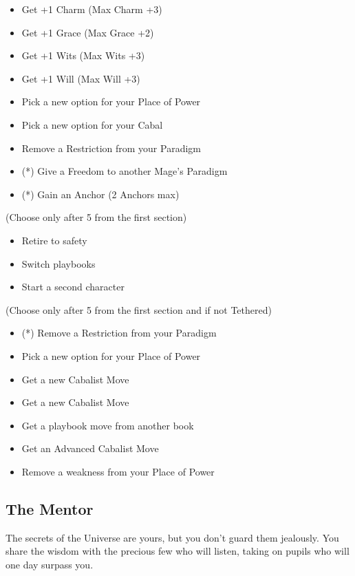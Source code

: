 \documentclass[
]{article}
\providecommand{\tightlist}{%
  \setlength{\itemsep}{0pt}\setlength{\parskip}{0pt}}
\begin{document}
\begin{itemize}
\tightlist
\item
  Get +1 Charm (Max Charm +3)
\item
  Get +1 Grace (Max Grace +2)
\item
  Get +1 Wits (Max Wits +3)
\item
  Get +1 Will (Max Will +3)
\item
  Pick a new option for your Place of Power
\item
  Pick a new option for your Cabal
\item
  Remove a Restriction from your Paradigm
\item
  (*) Give a Freedom to another Mage's Paradigm
\item
  (*) Gain an Anchor (2 Anchors max)
\end{itemize}

(Choose only after 5 from the first section)

\begin{itemize}
\tightlist
\item
  Retire to safety
\item
  Switch playbooks
\item
  Start a second character
\end{itemize}

(Choose only after 5 from the first section and if not Tethered)

\begin{itemize}
\tightlist
\item
  (*) Remove a Restriction from your Paradigm
\item
  Pick a new option for your Place of Power
\item
  Get a new Cabalist Move
\item
  Get a new Cabalist Move
\item
  Get a playbook move from another book
\item
  Get an Advanced Cabalist Move
\item
  Remove a weakness from your Place of Power
\end{itemize}

\newpage

\hypertarget{the-mentor}{%
\subsection{The Mentor}\label{the-mentor}}

The secrets of the Universe are yours, but you don't guard them
jealously. You share the wisdom with the precious few who will listen,
taking on pupils who will one day surpass you.
\end{document}
